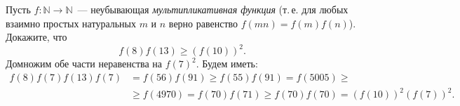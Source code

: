 \problem{}
Пусть $f \colon \mathbb{N} \to \mathbb{N}$~--- неубывающая
\emph{мультипликативная функция}
(т.\,е. для любых взаимно простых натуральных $m$ и $n$ верно равенство
$f(m n) = f(m) f(n)$).
Докажите, что
\[
    f(8) f(13) \geq (f(10))^2
.\]
\solution
Домножим обе части неравенства на $f(7)^2$.
Будем иметь:
\begin{align*}
    f(8) f(7) f(13) f(7) &{}= f(56) f(91)
\geq
    f(55) f(91) = f(5005)
\geq\\&{}\geq
    f(4970) = f(70) f(71)
\geq
    f(70) f(70) = (f(10))^2 (f(7))^2.
\end{align*}
\endproblem
